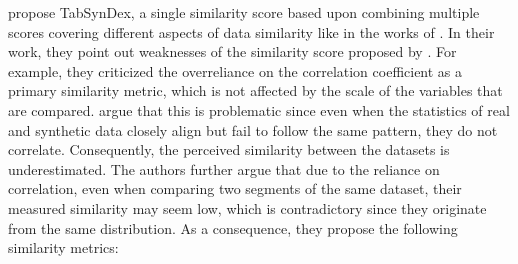 \textcite{chundawat2022UniversalMetricRobust} propose TabSynDex, a single similarity score based upon combining multiple scores covering different aspects of data similarity like in the works of \cite{brenninkmeijer2019GenerationEvaluationTabular}.
In their work, they point out weaknesses of the similarity score proposed by \textcite{brenninkmeijer2019GenerationEvaluationTabular}.
For example, they criticized the overreliance on the correlation coefficient as a primary similarity metric, which is not affected by the scale of the variables that are compared.
\textcite{chundawat2022UniversalMetricRobust} argue that this is problematic since even when the statistics of real and synthetic data closely align but fail to follow the same pattern, they do not correlate. 
Consequently, the perceived similarity between the datasets is underestimated.
The authors further argue that due to the reliance on correlation, even when comparing two segments of the same dataset, their measured similarity may seem low, which is contradictory since they originate from the same distribution.
As a consequence, they propose the following similarity metrics:

